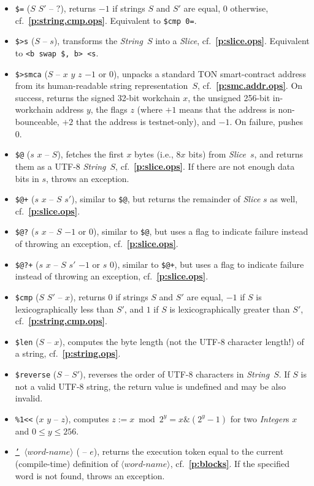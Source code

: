 \documentclass[12pt,oneside]{article}
\def\refpoint#1{{\rm\textbf{\ref{#1}}}}
\let\ptref=\refpoint
\begin{document}
\begin{itemize}
\item {\tt \$=} ($S$ $S'$ -- $?$), returns $-1$ if strings $S$ and $S'$ are equal, $0$ otherwise, cf.~\ptref{p:string.cmp.ops}. Equivalent to {\tt \$cmp 0=}.
\item {\tt \$>s} ($S$ -- $s$), transforms the {\em String\/}~$S$ into a {\em Slice}, cf.~\ptref{p:slice.ops}. Equivalent to {\tt <b swap \$, b> <s}.
\item {\tt \$>smca} ($S$ -- $x$ $y$ $z$ $-1$ or $0$), unpacks a standard TON smart-contract address from its human-readable string representation~$S$, cf.~\ptref{p:smc.addr.ops}. On success, returns the signed 32-bit workchain $x$, the unsigned 256-bit in-workchain address $y$, the flags $z$ (where $+1$ means that the address is non-bounceable, $+2$ that the address is testnet-only), and $-1$. On failure, pushes $0$.
\item {\tt \$@} ($s$ $x$ -- $S$), fetches the first $x$ bytes (i.e., $8x$ bits) from {\em Slice}~$s$, and returns them as a UTF-8 {\em String\/}~$S$, cf.~\ptref{p:slice.ops}. If there are not enough data bits in $s$, throws an exception.
\item {\tt \$@+} ($s$ $x$ -- $S$ $s'$), similar to {\tt \$@}, but returns the remainder of {\em Slice\/} $s$ as well, cf.~\ptref{p:slice.ops}.
\item {\tt \$@?} ($s$ $x$ -- $S$ $-1$ or $0$), similar to {\tt \$@}, but uses a flag to indicate failure instead of throwing an exception, cf.~\ptref{p:slice.ops}.
\item {\tt \$@?+} ($s$ $x$ -- $S$ $s'$ $-1$ or $s$ $0$), similar to {\tt \$@+}, but uses a flag to indicate failure instead of throwing an exception, cf.~\ptref{p:slice.ops}.
\item {\tt \$cmp} ($S$ $S'$ -- $x$), returns $0$ if strings $S$ and $S'$ are equal, $-1$ if $S$ is lexicographically less than $S'$, and $1$ if $S$ is lexicographically greater than $S'$, cf.~\ptref{p:string.cmp.ops}.
\item {\tt \$len} ($S$ -- $x$), computes the byte length (not the UTF-8 character length!) of a string, cf.~\ptref{p:string.ops}.
\item {\tt \$reverse} ($S$ -- $S'$), reverses the order of UTF-8 characters in {\em String\/}~$S$. If $S$ is not a valid UTF-8 string, the return value is undefined and may be also invalid.
\item {\tt \%1<{<}} ($x$ $y$ -- $z$), computes $z:=x\bmod 2^y=x\&(2^y-1)$ for two {\em Integer\/}s $x$ and $0\leq y\leq 256$.
\item {\tt \underline{'} $\langle\textit{word-name}\rangle$} ( -- $e$), returns the execution token equal to the current (compile-time) definition of $\langle\textit{word-name}\rangle$, cf.~\ptref{p:blocks}. If the specified word is not found, throws an exception.

\end{itemize}
\end{document}
